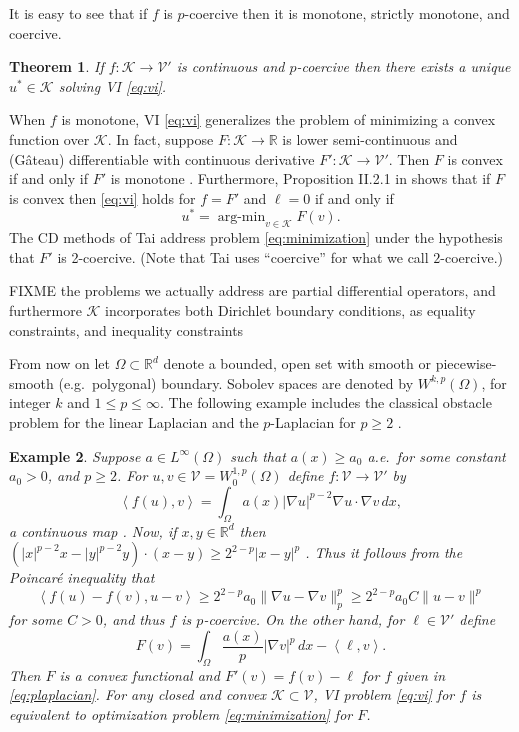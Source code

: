 \documentclass[letterpaper,final,12pt,reqno]{amsart}
\theoremstyle{cstyle}
\newtheorem{theorem}{Theorem}
\theoremstyle{cstyle*}
\theoremstyle{dstyle}
\newtheorem{example}[theorem]{Example}
\numberwithin{equation}{section}
\numberwithin{figure}{section}
\numberwithin{table}{section}
\numberwithin{theorem}{section}
\newcommand{\RR}{\mathbb{R}}
\newcommand{\grad}{\nabla}
\newcommand{\cK}{\mathcal{K}}
\newcommand{\cV}{\mathcal{V}}
\newcommand{\ip}[2]{\left<#1,#2\right>}
\begin{document}
It is easy to see that if $f$ is $p$-coercive then it is monotone, strictly monotone, and coercive.

\begin{theorem}  \label{thm:viwellposed}  If $f:\cK \to \cV'$ is continuous and $p$-coercive then there exists a unique $u^*\in \cK$ solving VI \eqref{eq:vi}.
\end{theorem}

When $f$ is monotone, VI \eqref{eq:vi} generalizes the problem of minimizing a convex function over $\cK$.  In fact, suppose $F:\cK \to \RR$ is lower semi-continuous and (G\^ateau) differentiable with continuous derivative $F':\cK \to \cV'$.  Then $F$ is convex if and only if $F'$ is monotone \cite[Proposition I.5.5]{EkelandTemam1976}.  Furthermore, Proposition II.2.1 in \cite{EkelandTemam1976} shows that if $F$ is convex then \eqref{eq:vi} holds for $f=F'$ and $\ell=0$ if and only if
\begin{equation}
u^* = \operatorname{arg-min}_{v\in\cK} F(v). \label{eq:minimization}
\end{equation}
The CD methods of Tai \cite{Tai2003} address problem \eqref{eq:minimization} under the hypothesis that $F'$ is 2-coercive.  (Note that Tai \cite{Tai2003} uses ``coercive'' for what we call $2$-coercive.)

FIXME the problems we actually address are partial differential operators, and furthermore $\mathcal{K}$ incorporates both Dirichlet boundary conditions, as equality constraints, and inequality constraints

From now on let $\Omega \subset \RR^d$ denote a bounded, open set with smooth or piecewise-smooth (e.g.~polygonal) boundary.  Sobolev spaces \cite{Evans2010} are denoted by $W^{k,p}(\Omega)$, for integer $k$ and $1\le p \le \infty$.  The following example includes the classical obstacle problem for the linear Laplacian \cite{GraeserKornhuber2009} and the $p$-Laplacian for $p\ge 2$ \cite{ChoeLewis1991}.

\begin{example}  \label{ex:plaplacian}  Suppose $a\in L^\infty(\Omega)$ such that $a(x)\ge a_0$ a.e.~for some constant $a_0>0$, and $p\ge 2$.  For $u,v \in \cV = W^{1,p}_0(\Omega)$ define $f:\cV \to \cV'$ by
\begin{equation}
\ip{f(u)}{v} = \int_\Omega a(x) |\grad u|^{p-2} \grad u \cdot \grad v\,dx, \label{eq:plaplacian}
\end{equation}
a continuous map \cite[Theorem A.0.6]{Peral1997}.  Now, if $x,y\in\RR^d$ then $(|x|^{p-2} x - |y|^{p-2} y)\cdot (x-y) \ge 2^{2-p} |x-y|^p$ \cite[see Appendix A and references therein]{Bueler2021conservation}.  Thus it follows from the Poincar\'e inequality that
    $$\ip{f(u) - f(v)}{u-v} \ge 2^{2-p} a_0 \|\grad u - \grad v\|_p^p \ge 2^{2-p} a_0 C \|u-v\|^p$$
for some $C>0$, and thus $f$ is $p$-coercive.  On the other hand, for $\ell\in\cV'$ define
    $$F(v) = \int_\Omega \frac{a(x)}{p} |\grad v|^p\,dx - \ip{\ell}{v}.$$
Then $F$ is a convex functional and $F'(v) = f(v) - \ell$ for $f$ given in \eqref{eq:plaplacian}.  For any closed and convex $\cK\subset \cV$, VI problem \eqref{eq:vi} for $f$ is equivalent to optimization problem \eqref{eq:minimization} for $F$.\end{example}
\end{document}
